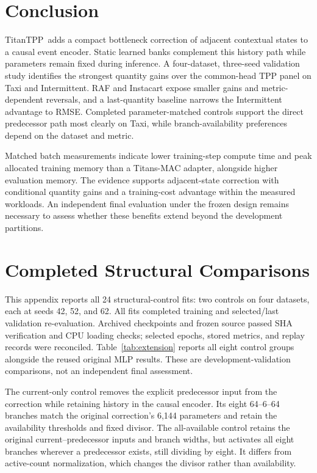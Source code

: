 \documentclass[runningheads]{llncs}
\newcommand{\method}{TitanTPP}
\begin{document}
\section{Conclusion}
\method\ adds a compact bottleneck correction of adjacent contextual states
to a causal event encoder. Static learned banks complement this history
path while parameters remain fixed during inference. A four-dataset,
three-seed validation study identifies the strongest quantity gains over
the common-head TPP panel on Taxi and Intermittent. RAF and Instacart expose
smaller gains and metric-dependent reversals, and a last-quantity baseline
narrows the Intermittent advantage to RMSE. Completed parameter-matched
controls support the direct predecessor path most clearly on Taxi, while
branch-availability preferences depend on the dataset and metric.

Matched batch measurements indicate lower training-step compute time and
peak allocated training memory than a Titans-MAC adapter, alongside higher
evaluation memory. The evidence supports adjacent-state correction with
conditional quantity gains and a training-cost advantage within the measured
workloads. An independent final evaluation under the frozen design remains
necessary to assess whether these benefits extend beyond the development
partitions.

\appendix
\section{Completed Structural Comparisons}\label{app:extension}
This appendix reports all 24 structural-control fits: two controls on four
datasets, each at seeds 42, 52, and 62. All fits completed training and
selected/last validation re-evaluation. Archived checkpoints and frozen
source passed SHA verification and CPU loading checks; selected epochs,
stored metrics, and replay records were reconciled. Table~\ref{tab:extension}
reports all eight control groups alongside the reused original MLP results.
These are development-validation comparisons, not an independent final
assessment.

The current-only control removes the explicit predecessor input from the
correction while retaining history in the causal encoder. Its eight
64--6--64 branches match the original correction's 6,144 parameters and
retain the availability thresholds and fixed divisor. The all-available
control retains the original current--predecessor inputs and branch widths,
but activates all eight branches wherever a predecessor exists, still
dividing by eight. It differs from active-count normalization, which changes
the divisor rather than availability.
\end{document}
